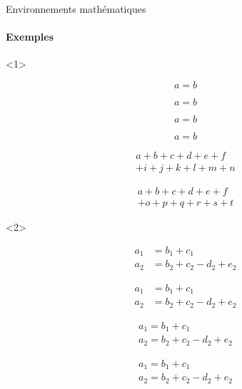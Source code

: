 \begin{frame}[fragile]{Environnements mathématiques}
	\framesubtitle{Exemples}

	\begin{onlyenv}
\begin{codesource}
	\begin{equation}
		a = b
	\end{equation}
\end{codesource}	
	\begin{equation}
		a = b
	\end{equation}
	
\begin{codesource}
	\begin{equation*}
		a = b
	\end{equation*}
\end{codesource}	
	\begin{equation*}
		a = b
	\end{equation*}
	
\begin{codesource}
	\begin{multline}
		a + b + c + d + e + f \\
		+ i + j + k + l + m + n
	\end{multline}
\end{codesource}
	\begin{multline}
	a + b + c + d + e + f \\
	+ o + p + q + r + s + t
	\end{multline}	
	\end{onlyenv}

	\begin{onlyenv}
\begin{codesource}
	\begin{align}
		a_1 &= b_1 + c_1 \\
		a_2 &= b_2 + c_2 - d_2 + e_2
	\end{align}
\end{codesource}
	\begin{align}
		a_1 &= b_1 + c_1 \\
		a_2 &= b_2 + c_2 - d_2 + e_2
	\end{align}
	
\begin{codesource}
	\begin{gather}
		a_1 = b_1 + c_1 \\
		a_2 = b_2 + c_2 - d_2 + e_2
	\end{gather}
\end{codesource}
	\begin{gather}
		a_1 = b_1 + c_1 \\
		a_2 = b_2 + c_2 - d_2 + e_2
	\end{gather}
	\end{onlyenv}


\end{frame}
